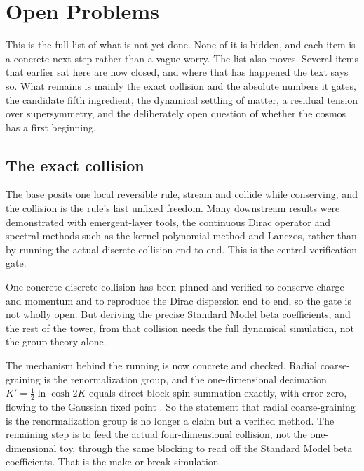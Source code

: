 \section{Open Problems}

This is the full list of what is not yet done. None of it is hidden, and each item is a concrete next step rather than a vague worry. The list also moves. Several items that earlier sat here are now closed, and where that has happened the text says so. What remains is mainly the exact collision and the absolute numbers it gates, the candidate fifth ingredient, the dynamical settling of matter, a residual tension over supersymmetry, and the deliberately open question of whether the cosmos has a first beginning.

\subsection{The exact collision}

The base posits one local reversible rule, stream and collide while conserving, and the collision is the rule's last unfixed freedom. Many downstream results were demonstrated with emergent-layer tools, the continuous Dirac operator and spectral methods such as the kernel polynomial method and Lanczos, rather than by running the actual discrete collision end to end. This is the central verification gate.

\begin{principle}
One concrete discrete collision has been pinned and verified to conserve charge and momentum and to reproduce the Dirac dispersion end to end, so the gate is not wholly open. But deriving the precise Standard Model beta coefficients, and the rest of the tower, from that collision needs the full dynamical simulation, not the group theory alone.
\end{principle}

The mechanism behind the running is now concrete and checked. Radial coarse-graining is the renormalization group, and the one-dimensional decimation $K' = \tfrac{1}{2}\ln\cosh 2K$ equals direct block-spin summation exactly, with error zero, flowing to the Gaussian fixed point \cite{pollard2026vibetest}. So the statement that radial coarse-graining is the renormalization group is no longer a claim but a verified method. The remaining step is to feed the actual four-dimensional collision, not the one-dimensional toy, through the same blocking to read off the Standard Model beta coefficients. That is the make-or-break simulation.

